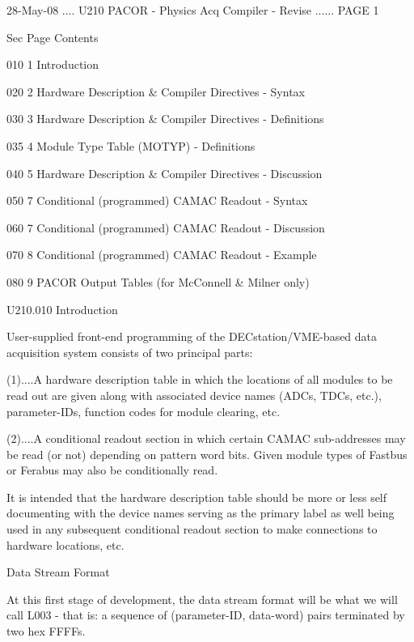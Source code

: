    28-May-08 .... U210  PACOR -  Physics Acq Compiler - Revise ...... PAGE   1
 
 
 
   Sec Page Contents
 
   010   1  Introduction
 
   020   2  Hardware Description & Compiler Directives - Syntax
 
   030   3  Hardware Description & Compiler Directives - Definitions
 
   035   4  Module Type Table (MOTYP)                  - Definitions
 
   040   5  Hardware Description & Compiler Directives - Discussion
 
   050   7  Conditional (programmed) CAMAC Readout     - Syntax
 
   060   7  Conditional (programmed) CAMAC Readout     - Discussion
 
   070   8  Conditional (programmed) CAMAC Readout     - Example
 
   080   9  PACOR Output Tables (for McConnell & Milner only)
 
 
   U210.010  Introduction
 
   User-supplied  front-end  programming  of  the  DECstation/VME-based   data
   acquisition system consists of two principal parts:
 
   (1)....A  hardware  description table in which the locations of all modules
          to be read out are given along with associated device  names  (ADCs,
          TDCs, etc.), parameter-IDs, function codes for module clearing, etc.
 
 
   (2)....A  conditional  readout section in which certain CAMAC sub-addresses
          may be read (or not) depending on pattern word  bits.  Given  module
          types of Fastbus or Ferabus may also be conditionally read.
 
   It  is  intended that the hardware description table should be more or less
   self documenting with the device names serving as the primary label as well
   being   used   in  any  subsequent  conditional  readout  section  to  make
   connections to hardware locations, etc.
 
                               Data Stream Format
 
   At this first stage of development, the data stream format will be what  we
   will  call  L003  -  that is: a sequence of (parameter-ID, data-word) pairs
   terminated by two hex FFFFs.
 
